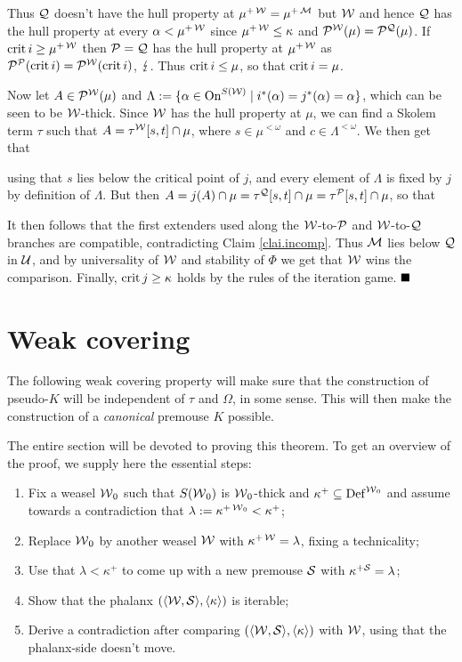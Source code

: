Thus $\Q$ doesn't have the hull property at $\mu^{+\W}=\mu^{+\M}$ but $\W$ and hence $\Q$ has the hull property at every $\alpha<\mu^{+\W}$ since $\mu^{+\W}\leq\kappa$ and $\P^{\W}(\mu)=\P^{\Q}(\mu)$. If $\crit i\geq\mu^{+\W}$ then $\P=\Q$ has the hull property at $\mu^{+\W}$ as $\P^{\P}(\crit i)=\P^{\W}(\crit i)$, $\contr$. Thus $\crit i\leq\mu$, so that $\crit i=\mu$.

\qquad Now let $A\in\P^{\W}(\mu)$ and $\Lambda:=\{\alpha\in \on^{S(\W)}\mid i^*(\alpha)=j^*(\alpha)=\alpha\}$, which can be seen to be $\W$-thick. Since $\W$ has the hull property at $\mu$, we can find a Skolem term $\tau$ such that $A=\tau^{\W}[s,t]\cap\mu$, where $s\in\mu^{<\omega}$ and $c\in\Lambda^{<\omega}$. We then get that

using that $s$ lies below the critical point of $j$, and every element of $\Lambda$ is fixed by $j$ by definition of $\Lambda$. But then $A=j(A)\cap\mu=\tau^{\Q}[s,t]\cap\mu=\tau^{\P}[s,t]\cap\mu$, so that

It then follows that the first extenders used along the $\W$-to-$\P$ and $\W$-to-$\Q$ branches are compatible, contradicting Claim \ref{clai.incomp}. Thus $\M$ lies below $\Q$ in $\U$, and by universality of $\W$ and stability of $\Phi$ we get that $\W$ wins the comparison. Finally, $\crit j\geq\kappa$ holds by the rules of the iteration game.
$\qed$\\


\section{Weak covering}

The following weak covering property will make sure that the construction of pseudo-$K$ will be independent of $\tau$ and $\Omega$, in some sense. This will then make the construction of a \textit{canonical} premouse $K$ possible.


The entire section will be devoted to proving this theorem. To get an overview of the proof, we supply here the essential steps:
\begin{enumerate}
\item Fix a weasel $\W_0$ such that $S(\W_0)$ is $\W_0$-thick and $\kappa^+\subset\Def^{\W_0}$ and assume towards a contradiction that $\lambda:=\kappa^{+\W_0}<\kappa^+$;
\item Replace $\W_0$ by another weasel $\W$ with $\kappa^{+\W}=\lambda$, fixing a technicality;
\item Use that $\lambda<\kappa^+$ to come up with a new premouse $\S$ with $\kappa^{+\S}=\lambda$;
\item Show that the phalanx $(\bra{\W,\S},\bra{\kappa})$ is iterable;
\item Derive a contradiction after comparing $(\bra{\W,\S},\bra{\kappa})$ with $\W$, using that the phalanx-side doesn't move.\\
\end{enumerate}

